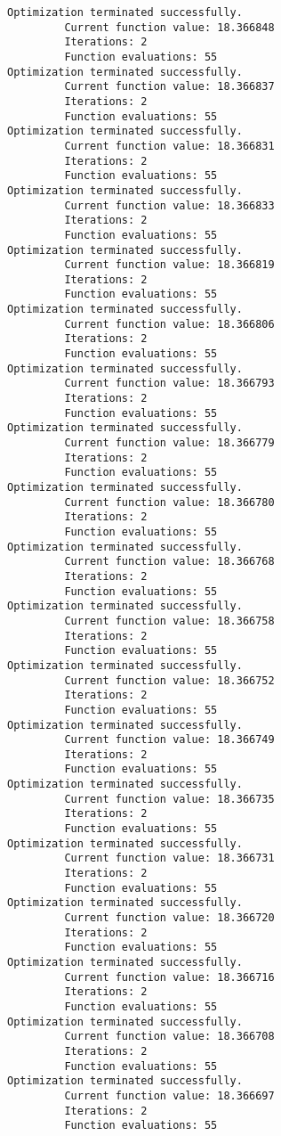 \documentclass[11pt]{article}
\begin{document}
\begin{Verbatim}[commandchars=\\\{\}]
Optimization terminated successfully.
         Current function value: 18.366848
         Iterations: 2
         Function evaluations: 55
Optimization terminated successfully.
         Current function value: 18.366837
         Iterations: 2
         Function evaluations: 55
Optimization terminated successfully.
         Current function value: 18.366831
         Iterations: 2
         Function evaluations: 55
Optimization terminated successfully.
         Current function value: 18.366833
         Iterations: 2
         Function evaluations: 55
Optimization terminated successfully.
         Current function value: 18.366819
         Iterations: 2
         Function evaluations: 55
Optimization terminated successfully.
         Current function value: 18.366806
         Iterations: 2
         Function evaluations: 55
Optimization terminated successfully.
         Current function value: 18.366793
         Iterations: 2
         Function evaluations: 55
Optimization terminated successfully.
         Current function value: 18.366779
         Iterations: 2
         Function evaluations: 55
Optimization terminated successfully.
         Current function value: 18.366780
         Iterations: 2
         Function evaluations: 55
Optimization terminated successfully.
         Current function value: 18.366768
         Iterations: 2
         Function evaluations: 55
Optimization terminated successfully.
         Current function value: 18.366758
         Iterations: 2
         Function evaluations: 55
Optimization terminated successfully.
         Current function value: 18.366752
         Iterations: 2
         Function evaluations: 55
Optimization terminated successfully.
         Current function value: 18.366749
         Iterations: 2
         Function evaluations: 55
Optimization terminated successfully.
         Current function value: 18.366735
         Iterations: 2
         Function evaluations: 55
Optimization terminated successfully.
         Current function value: 18.366731
         Iterations: 2
         Function evaluations: 55
Optimization terminated successfully.
         Current function value: 18.366720
         Iterations: 2
         Function evaluations: 55
Optimization terminated successfully.
         Current function value: 18.366716
         Iterations: 2
         Function evaluations: 55
Optimization terminated successfully.
         Current function value: 18.366708
         Iterations: 2
         Function evaluations: 55
Optimization terminated successfully.
         Current function value: 18.366697
         Iterations: 2
         Function evaluations: 55

\end{Verbatim}
\end{document}
